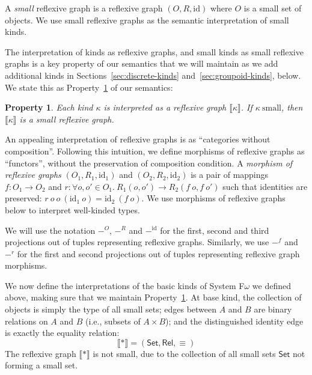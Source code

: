 \documentclass[preprint]{sigplanconf}
\newtheorem{property}{Property}
\theoremstyle{examplestyle}
\newcommand{\sem}[1]{\llbracket #1 \rrbracket}
\newcommand{\Set}{\mathsf{Set}}
\newcommand{\Rel}{\mathsf{Rel}}
\begin{document}
A \emph{small} reflexive graph is a reflexive graph $(O, R,
\mathrm{id})$ where $O$ is a small set of objects. We use small
reflexive graphs as the semantic interpretation of small kinds.

The interpretation of kinds as reflexive graphs, and small kinds as
small reflexive graphs is a key property of our semantics that we will
maintain as we add additional kinds in
Sections~\ref{sec:discrete-kinds} and~\ref{sec:groupoid-kinds},
below. We state this as Property~\ref{property:semantic-kinds} of our
semantics:

\begin{property}\label{property:semantic-kinds}
  Each kind $\kappa$ is interpreted as a reflexive graph
  $\sem{\kappa}$. If $\kappa~\mathrm{small}$, then $\sem{\kappa}$ is a
  small reflexive graph.
\end{property}

An appealing interpretation of reflexive graphs is as ``categories
without composition''. Following this intuition, we define morphisms
of reflexive graphs as ``functors'', without the preservation of
composition condition. A \emph{morphism of reflexive graphs}
$(O_1,R_1,\mathrm{id}_1)$ and $(O_2, R_2, \mathrm{id}_2)$ is a pair of
mappings $f : O_1 \to O_2$ and $r : \forall o, o' \in
O_1.~R_1(o,o') \to R_2(f~o, f~o')$ such that identities are
preserved: $r~o~o~(\mathrm{id}_1~o) = \mathrm{id}_2~(f~o)$. We use
morphisms of reflexive graphs below to interpret well-kinded types.

We will use the notation $-^O$, $-^R$ and $-^{\mathrm{id}}$ for the
first, second and third projections out of tuples representing
reflexive graphs. Similarly, we use $-^f$ and $-^r$ for the first and
second projections out of tuples representing reflexive graph
morphisms.

We now define the interpretations of the basic kinds of System
F$\omega$ we defined above, making sure that we maintain
Property~\ref{property:semantic-kinds}. At base kind, the collection
of objects is simply the type of all small sets; edges between $A$ and
$B$ are binary relations on $A$ and $B$ (i.e., subsets of $A \times
B$); and the distinguished identity edge is exactly the equality
relation:
\begin{displaymath}
  \sem{*} = (\Set, \Rel, \equiv)
\end{displaymath}
The reflexive graph $\sem{*}$ is not small, due to the collection of
all small sets $\Set$ not forming a small set.
\end{document}
